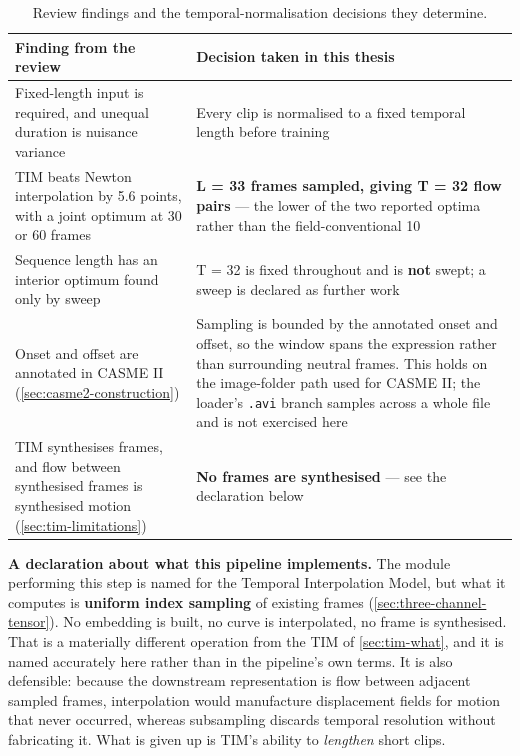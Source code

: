 \begin{table}[htbp]
	\centering
	\footnotesize
	\begin{tabular}{@{}p{5.6cm} p{8.0cm}@{}}
		\hline
		\textbf{Finding from the review} & \textbf{Decision taken in this thesis} \\
		\hline
		Fixed-length input is required, and unequal duration is nuisance variance~\cite{lu2015} & Every clip is normalised to a fixed temporal length before training \\
		TIM beats Newton interpolation by 5.6 points, with a joint optimum at 30 or 60 frames~\cite{ben2021} & \textbf{L = 33 frames sampled, giving T = 32 flow pairs} --- the lower of the two reported optima rather than the field-conventional 10 \\
		Sequence length has an interior optimum found only by sweep~\cite{ben2021} & T = 32 is fixed throughout and is \textbf{not} swept; a sweep is declared as further work \\
		Onset and offset are annotated in CASME II (\autoref{sec:casme2-construction}) & Sampling is bounded by the annotated onset and offset, so the window spans the expression rather than surrounding neutral frames. This holds on the image-folder path used for CASME II; the loader's \texttt{.avi} branch samples across a whole file and is not exercised here \\
		TIM synthesises frames, and flow between synthesised frames is synthesised motion (\autoref{sec:tim-limitations}) & \textbf{No frames are synthesised} --- see the declaration below \\
		\hline
	\end{tabular}
	\caption[Review findings and the temporal-normalisation decisions they determine]{Review findings and the temporal-normalisation decisions they determine.}
	\label{tab:tim-decisions}
\end{table}

\textbf{A declaration about what this pipeline implements.} The module performing this step is named for the Temporal Interpolation Model, but what it computes is \textbf{uniform index sampling} of existing frames (\autoref{sec:three-channel-tensor}). No embedding is built, no curve is interpolated, no frame is synthesised. That is a materially different operation from the TIM of \autoref{sec:tim-what}, and it is named accurately here rather than in the pipeline's own terms. It is also defensible: because the downstream representation is flow between adjacent sampled frames, interpolation would manufacture displacement fields for motion that never occurred, whereas subsampling discards temporal resolution without fabricating it. What is given up is TIM's ability to \textit{lengthen} short clips.

